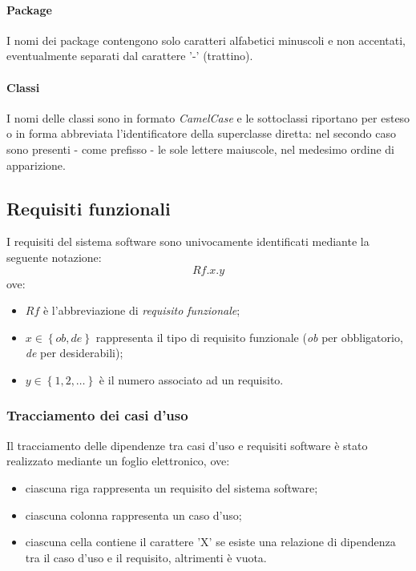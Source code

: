 \paragraph{Package}
I nomi dei package contengono solo caratteri alfabetici minuscoli e non accentati, eventualmente separati dal carattere '-' (trattino).

\paragraph{Classi}
I nomi delle classi sono in formato \textit{CamelCase} e le sottoclassi riportano per esteso o in forma abbreviata l'identificatore della superclasse diretta: nel secondo caso sono presenti - come prefisso - le sole lettere maiuscole, nel medesimo ordine di apparizione.

\subsection{Requisiti funzionali}
I requisiti del sistema software sono univocamente identificati mediante la seguente notazione:
$$Rf.x.y$$
ove:
\begin{itemize}
\item $Rf$ è l'abbreviazione di \textit{requisito funzionale};
\item $x \in \left\{ob,de\right\}$ rappresenta il tipo di requisito funzionale (\textit{ob} per obbligatorio, \textit{de} per desiderabili);
\item $y \in \left\{1,2,\ldots\right\}$ è il numero associato ad un requisito.
\end{itemize}

\subsubsection{Tracciamento dei casi d'uso}
Il tracciamento delle dipendenze tra casi d'uso e requisiti software è stato realizzato mediante un foglio elettronico, ove:
\begin{itemize}
\item ciascuna riga rappresenta un requisito del sistema software;
\item ciascuna colonna rappresenta un caso d'uso;
\item ciascuna cella contiene il carattere 'X' se esiste una relazione di dipendenza tra il caso d'uso e il requisito, altrimenti è vuota.
\end{itemize}

